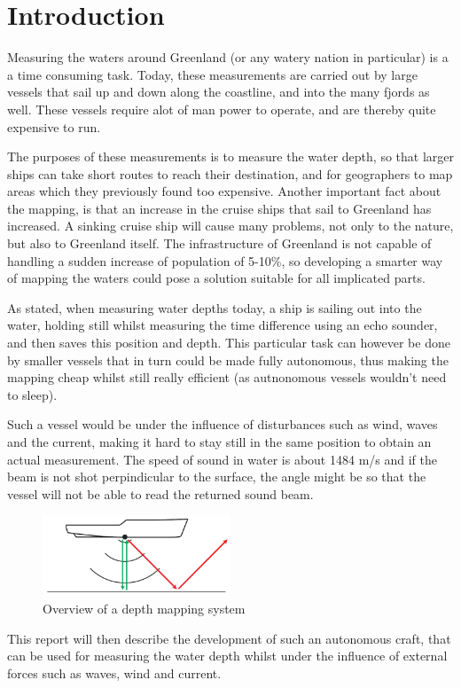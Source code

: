 \documentclass{article}
\begin{document}
\section{Introduction}
Measuring the waters around Greenland (or any watery nation in particular) is a a time consuming task. Today, these measurements are carried out by large vessels that sail up and down along the coastline, and into the many fjords as well. These vessels require alot of man power to operate, and are thereby quite expensive to run.

The purposes of these measurements is to measure the water depth, so that larger ships can take short routes to reach their destination, and for geographers to map areas which they previously found too expensive. Another important fact about the mapping, is that an increase in the cruise ships that sail to Greenland has increased. A sinking cruise ship will cause many problems, not only to the nature, but also to Greenland itself. The infrastructure of Greenland is not capable of handling a sudden increase of population of 5-10\%, so developing a smarter way of mapping the waters could pose a solution suitable for all implicated parts. 

As stated, when measuring water depths today, a ship is sailing out into the water, holding still whilst measuring the time difference using an echo sounder, and then saves this position and depth. This particular task can however be done by smaller vessels that in turn could be made fully autonomous, thus making the mapping cheap whilst still really efficient (as autnonomous vessels wouldn't need to sleep). 

Such a vessel would be under the influence of disturbances such as wind, waves and the current, making it hard to stay still in the same position to obtain an actual measurement. The speed of sound in water is about 1484 m/s and if the beam is not shot perpindicular to the surface, the angle might be so that the vessel will not be able to read the returned sound beam. 

\begin{figure}
\centering
\includegraphics[width=0.5\textwidth]{img/beamer}
\caption{Overview of a depth mapping system}
\label{fig:beamer}
\end{figure}

This report will then describe the development of such an autonomous craft, that can be used for measuring the water depth whilst under the influence of external forces such as waves, wind and current. 
\end{document}
